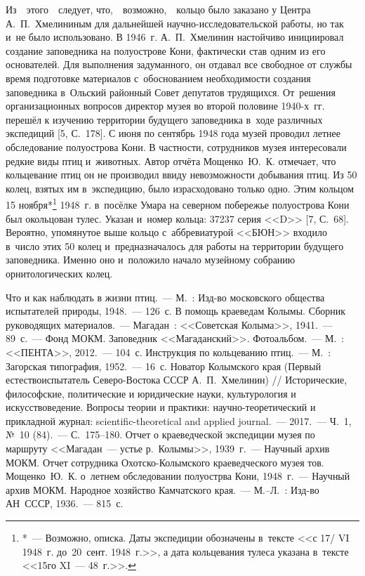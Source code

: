 Из\ \ этого\ \ следует, что,\ \ возможно,\ \ кольцо было заказано у Центра А.~П.~Хмелининым для дальнейшей научно-исследовательской работы, но так и~не было использовано. В 1946~г. А.~П.~Хмелинин настойчиво инициировал создание заповедника на полуострове Кони, фактически став одним из его основателей. Для выполнения задуманного, он отдавал все свободное от службы время подготовке материалов с~обоснованием необходимости создания заповедника в~Ольский районный Совет депутатов трудящихся. От~решения организационных вопросов директор музея во второй половине 1940-х~гг. перешёл к изучению территории будущего заповедника в~ходе различных экспедиций [5, С.~178]. С июня по сентябрь 1948 года музей проводил летнее обследование полуострова Кони. В частности, сотрудников музея интересовали редкие виды птиц и~животных. Автор отчёта Мощенко~Ю.~К. отмечает, что кольцевание птиц он не производил ввиду невозможности добывания птиц. Из 50 колец, взятых им в~экспедицию, было израсходовано только одно. Этим кольцом 15 ноября*\footnote{*~--- Возможно, описка.  Даты экспедиции обозначены в~тексте <<с 17/ VI 1948~г. до~20~сент. 1948~г.>>, а дата кольцевания тулеса указана в~тексте <<15го XI~--- 48~г.>>.} 1948~г. в~посёлке Умара на северном побережье полуострова Кони был окольцован тулес. Указан и~номер кольца: 37237 серия <<D>> [7, С.~68]. Вероятно, упомянутое выше кольцо с~аббревиатурой <<БЮН>> входило в~число этих 50 колец и~предназначалось для работы на территории будущего заповедника. Именно оно и~положило начало музейному собранию орнитологических колец.

\begin{thebibliography}{99}

\bibitem{} Что и как наблюдать в жизни птиц.~--- М.~: Изд-во московского общества испытателей природы, 1948.~--- 126~с.
\bibitem{}В помощь краеведам Колымы. Сборник руководящих материалов.~--- Магадан~: <<Советская Колыма>>, 1941.~--- 89~с.~--- Фонд МОКМ.
\bibitem{}Заповедник <<Магаданский>>. Фотоальбом.~--- М.~: <<ПЕНТА>>, 2012.~--- 104~с.
\bibitem{}Инструкция по кольцеванию птиц.~--- М.~: Загорская типография, 1952.~--- 16~с.
\bibitem{}Новатор Колымского края (Первый естествоиспытатель Северо-Востока СССР А.~П.~Хмелинин) // Исторические, философские, политические и юридические науки, культурология и искусствоведение. Вопросы теории и практики: научно-теоретический и прикладной журнал: scientific-theoretical and applied journal.~--- 2017.~--- Ч.~1, №~10 (84).~--- С.~175--180.
\bibitem{}Отчет о краеведческой экспедиции музея по маршруту <<Магадан~--- устье р.~Колымы>>, 1939~г.~--- Научный архив МОКМ.
\bibitem{}Отчет сотрудника Охотско-Колымского краеведческого музея тов. Мощенко~Ю.~К. о~летнем обследовании полуострва Кони, 1948~г.~--- Научный архив МОКМ.
\bibitem{} Народное хозяйство Камчатского края.~--- М.--Л.~: Изд-во АН~СССР, 1936.~--- 815~с.



\end{thebibliography}
